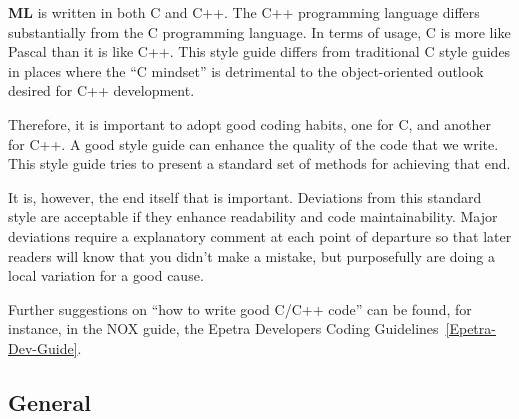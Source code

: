 \documentclass[10pt,letter,relax]{SANDreport}
\newcommand{\ML}     {{\bf ML }}
\begin{document}
\ML is written in both C and C++.
The C++ programming language differs substantially from the C
programming language. In terms of usage, C is more like Pascal than it
is like C++. This style guide differs from traditional C style guides in
places where the ``C mindset'' is detrimental to the object-oriented
outlook desired for C++ development.

Therefore, it is important to adopt good coding habits, one for C, and
another for C++. A good style guide can enhance the quality of the code
that we write.  This style guide tries to present a standard set of
methods for achieving that end.

It is, however, the end itself that is important. Deviations from this
standard style are acceptable if they enhance readability and code
maintainability. Major deviations require a explanatory comment at each
point of departure so that later readers will know that you didn't make
a mistake, but purposefully are doing a local variation for a good
cause.

Further suggestions on ``how to write good C/C++ code'' can be found,
for instance, in the NOX guide, the Epetra Developers Coding
Guidelines~\ref{Epetra-Dev-Guide}.

\subsection{General}
\end{document}
